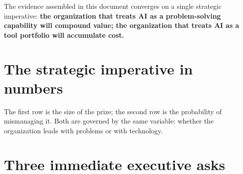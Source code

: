 
The evidence assembled in this document converges on a single strategic
imperative: \textbf{the organization that treats AI as a problem-solving
capability will compound value; the organization that treats AI as a tool
portfolio will accumulate cost.}

\section{The strategic imperative in numbers}

\vspace{-0.3em}
\begin{center}
  \hfill
  \hfill
\end{center}

\begin{center}
  \hfill
  \hfill
\end{center}

The first row is the size of the prize; the second row is the probability of
mismanaging it. Both are governed by the same variable: whether the
organization leads with problems or with technology.

\section{Three immediate executive asks}

